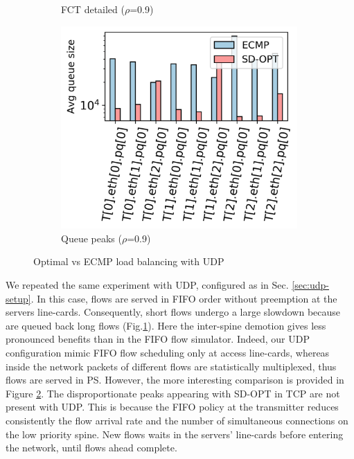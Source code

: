 \begin{figure}[!tb]
\begin{subfigure}{.33\textwidth}
		\captionsetup{justification=centering, width=0.7\linewidth}
		\caption{FCT detailed ($\rho$=0.9)}
		\label{fig:opt-vs-ecmp-fct-detailed-udp}
	\end{subfigure}%
	\hfill
	\begin{subfigure}{.33\textwidth}
		\centering
		\includegraphics[width=0.99\textwidth]{Chapter4/Figures/queue_peaks_N_1_udp}
		\caption{Queue peaks ($\rho$=0.9)}
		\label{fig:opt-vs-ecmp-queue-peaks-udp}		
	\end{subfigure}%
	\caption{Optimal vs ECMP load balancing with UDP}
	\label{fig:opt-vs-ecmp-lb-udp}
\end{figure}%
We repeated the same experiment with UDP, configured as in Sec. \ref{sec:udp-setup}. In this case, flows are served in FIFO order without preemption at the servers line-cards. Consequently, short flows undergo a large slowdown because are queued back long flows (Fig.\ref{fig:opt-vs-ecmp-fct-detailed-udp}). Here the inter-spine demotion gives less pronounced benefits than in the FIFO flow simulator. Indeed, our UDP configuration mimic FIFO flow scheduling only at access line-cards, whereas inside the network packets of different flows are statistically multiplexed, thus flows are served in PS. However, the more interesting comparison is provided in Figure \ref{fig:opt-vs-ecmp-queue-peaks-udp}. The disproportionate peaks appearing with SD-OPT in TCP are not present with UDP. This is because the FIFO policy at the transmitter reduces consistently the flow arrival rate and the number of simultaneous connections on the low priority spine. New flows waits in the servers' line-cards before entering the network, until flows ahead complete. 
